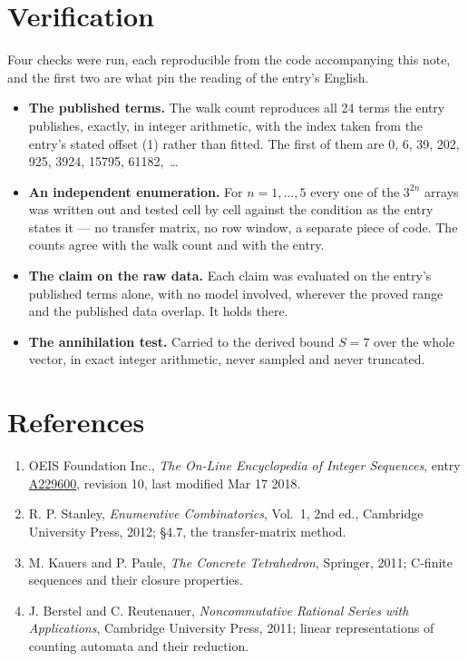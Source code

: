 \documentclass[11pt]{article}
\theoremstyle{definition}
\begin{document}
\section{Verification}

Four checks were run, each reproducible from the code accompanying this note, and the first two are what pin the reading of the entry's English.

\begin{itemize}

\item {\bfseries The published terms.} The walk count reproduces all 24 terms the entry publishes, exactly, in integer arithmetic, with the index taken from the entry's stated offset (1) rather than fitted. The first of them are 0, 6, 39, 202, 925, 3924, 15795, 61182,~\dots

\item {\bfseries An independent enumeration.} For $n = 1,\dots,5$ every one of the $3^{2n}$ arrays was written out and tested cell by cell against the condition as the entry states it --- no transfer matrix, no row window, a separate piece of code. The counts agree with the walk count and with the entry.

\item {\bfseries The claim on the raw data.} Each claim was evaluated on the entry's published terms alone, with no model involved, wherever the proved range and the published data overlap. It holds there.

\item {\bfseries The annihilation test.} Carried to the derived bound $S = 7$ over the whole vector, in exact integer arithmetic, never sampled and never truncated.

\end{itemize}

\section{References}

\begin{enumerate}

\item OEIS Foundation Inc., \emph{The On-Line Encyclopedia of Integer Sequences}, entry \href{https://oeis.org/A229600}{A229600}, revision 10, last modified Mar 17 2018.

\item R. P. Stanley, \emph{Enumerative Combinatorics}, Vol.~1, 2nd ed., Cambridge University Press, 2012; \S4.7, the transfer-matrix method.

\item M. Kauers and P. Paule, \emph{The Concrete Tetrahedron}, Springer, 2011; C-finite sequences and their closure properties.

\item J. Berstel and C. Reutenauer, \emph{Noncommutative Rational Series with Applications}, Cambridge University Press, 2011; linear representations of counting automata and their reduction.

\end{enumerate}
\end{document}
